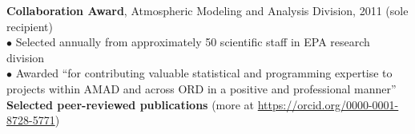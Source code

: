 \documentclass[11pt]{article}
\def\newsectn{\vspace*{0.6cm}}
\def\newitem{\vspace*{0.2cm}}
\begin{document}
\newitem
\textbf{Collaboration Award}, Atmospheric Modeling and Analysis Division, 2011 (sole recipient)\\
$\bullet$ Selected annually from approximately 50 scientific staff in EPA research
division\\
$\bullet$ Awarded ``for contributing valuable statistical and programming
expertise to projects within AMAD and across ORD in a positive and professional
manner''\\











\newsectn
{\Large \textbf{Selected peer-reviewed publications}} (more at
\url{https://orcid.org/0000-0001-8728-5771})

\end{document}
